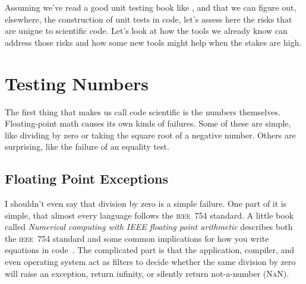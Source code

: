 \documentclass[fleqn,10pt]{olplainarticle}
\newcommand{\nan}{\textsc{NaN}\xspace}
\newcommand{\ieee}{\textsc{ieee}\xspace}
\begin{document}
Assuming we've read a good unit testing book like \cite{jorgensen2013},
and that we can figure out, elsewhere, the construction of unit tests
in code, let's assess here the risks that are unigue to scientific code.
Let's look at how the tools we already know can address those risks
and how some new tools might help when the stakes are high.




\section{Testing Numbers}\label{sec:ieee-numbers}

The first thing that makes us call code scientific is the numbers themselves.
Floating-point math causes its own kinds of failures. Some of these are simple,
like dividing by zero or taking the square root of a negative number.
Others are surprising, like the failure of an equality test.

\subsection{Floating Point Exceptions}
I shouldn't even say that division by zero is a simple failure.
One part of it is simple, that almost every language follows the
\ieee~754 standard.
A little book called \emph{Numerical computing with IEEE floating point arithmetic}
describes both the \ieee~754 standard
and some common implications for how you write equations in code~\citep{overton2001numerical,goldberg1991every}.
The complicated part is that the application, compiler,
and even operating system act as filters to decide whether the same division
by zero will raise an exception, return infinity, or silently return not-a-number (\nan).
\end{document}
